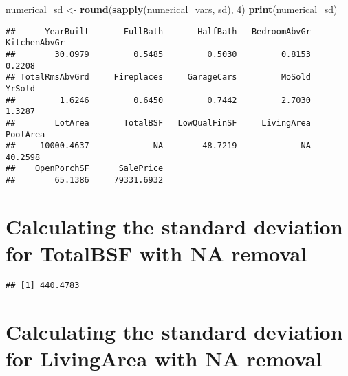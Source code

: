 \documentclass[
]{article}
\newenvironment{Shaded}{\begin{snugshade}}{\end{snugshade}}
\newcommand{\AttributeTok}[1]{\textcolor[rgb]{0.13,0.29,0.53}{#1}}
\newcommand{\ConstantTok}[1]{\textcolor[rgb]{0.56,0.35,0.01}{#1}}
\newcommand{\DecValTok}[1]{\textcolor[rgb]{0.00,0.00,0.81}{#1}}
\newcommand{\FunctionTok}[1]{\textcolor[rgb]{0.13,0.29,0.53}{\textbf{#1}}}
\newcommand{\NormalTok}[1]{#1}
\newcommand{\OtherTok}[1]{\textcolor[rgb]{0.56,0.35,0.01}{#1}}
\newcommand{\SpecialCharTok}[1]{\textcolor[rgb]{0.81,0.36,0.00}{\textbf{#1}}}
\begin{document}
\begin{Shaded}
\begin{Highlighting}[]
\NormalTok{numerical\_sd }\OtherTok{\textless{}{-}} \FunctionTok{round}\NormalTok{(}\FunctionTok{sapply}\NormalTok{(numerical\_vars, sd), }\DecValTok{4}\NormalTok{)}
\FunctionTok{print}\NormalTok{(numerical\_sd)}
\end{Highlighting}
\end{Shaded}

\begin{verbatim}
##      YearBuilt       FullBath       HalfBath   BedroomAbvGr   KitchenAbvGr 
##        30.0979         0.5485         0.5030         0.8153         0.2208 
## TotalRmsAbvGrd     Fireplaces     GarageCars         MoSold         YrSold 
##         1.6246         0.6450         0.7442         2.7030         1.3287 
##        LotArea       TotalBSF   LowQualFinSF     LivingArea       PoolArea 
##     10000.4637             NA        48.7219             NA        40.2598 
##    OpenPorchSF      SalePrice 
##        65.1386     79331.6932
\end{verbatim}

\hypertarget{calculating-the-standard-deviation-for-totalbsf-with-na-removal}{%
\section{Calculating the standard deviation for TotalBSF with NA
removal}\label{calculating-the-standard-deviation-for-totalbsf-with-na-removal}}

\begin{Shaded}
\end{Shaded}

\begin{verbatim}
## [1] 440.4783
\end{verbatim}

\hypertarget{calculating-the-standard-deviation-for-livingarea-with-na-removal}{%
\section{Calculating the standard deviation for LivingArea with NA
removal}\label{calculating-the-standard-deviation-for-livingarea-with-na-removal}}
\end{document}
